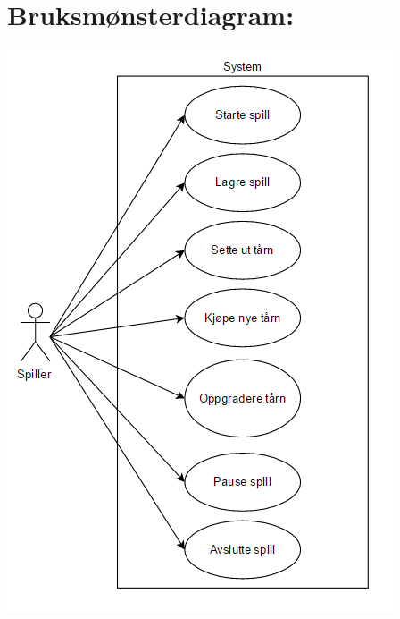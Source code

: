 \documentclass[12pt]{report}
\begin{document}
\section*{Bruksm{\o}nsterdiagram:}
\vspace{1cm}
\includegraphics{use_case_diagram_t.png}
\end{document}
